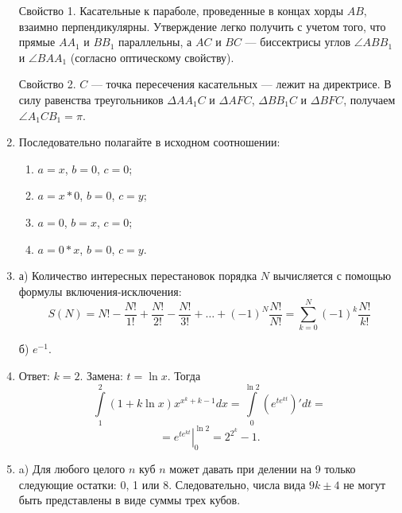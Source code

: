 \documentclass[11pt, a4paper]{article}
\begin{document}
\begin{enumerate}
Свойство 1. Касательные к параболе, проведенные в концах хорды $AB$, взаимно перпендикулярны. Утверждение легко получить с учетом того, что прямые $AA_1$ и $BB_1$ параллельны, а $AC$ и $BC$ --- биссектрисы углов $\angle ABB_1$ и $\angle BAA_1$ (согласно оптическому свойству).

Свойство 2. $C$ --- точка пересечения касательных --- лежит на директрисе. В силу равенства треугольников $\Delta AA_1C$ и $\Delta AFC$, $\Delta BB_1C$ и $\Delta BFC$, получаем $\angle A_1CB_1 = \pi$.

\item Последовательно полагайте в исходном соотношении:
\begin{enumerate}
\item $a = x$, $b = 0$, $c = 0$;
\item $a = x * 0$, $b = 0$, $c = y$;
\item $a = 0$, $b = x$, $c = 0$;
\item $a = 0 * x$, $b = 0$, $c = y$.
\end{enumerate}

\item а) Количество интересных перестановок порядка $N$ вычисляется с помощью формулы включения-исключения:
$$S(N) = N!-{\frac {N!}{1!}}+{\frac {N!}{2!}}-{\frac {N!}{3!}} + \dots +(-1)^{N}{\frac {N!}{N!}}=\sum _{k=0}^{N}(-1)^{k}{\frac {N!}{k!}}
$$

б) $e^{-1}$.

\item Ответ: $k = 2$. Замена: $t = \ln{x}$. Тогда
$$\int\limits_{1}^{2} \left( 1 + k \ln{x} \right) x^{x^k + k - 1} dx = \int\limits_{0}^{\ln{2}} \left(e^{te^{kt}} \right)' dt = $$
$$=\left. e^{te^{kt}} \right|_{0}^{\ln{2}} = 2^{2^k} - 1.$$

\item a) Для любого целого $n$ куб $n$ может давать при делении на 9 только следующие остатки: 0, 1 или 8. Следовательно, числа вида $9k \pm 4$ не могут быть представлены в виде суммы трех кубов.


\end{enumerate}
\end{document}

